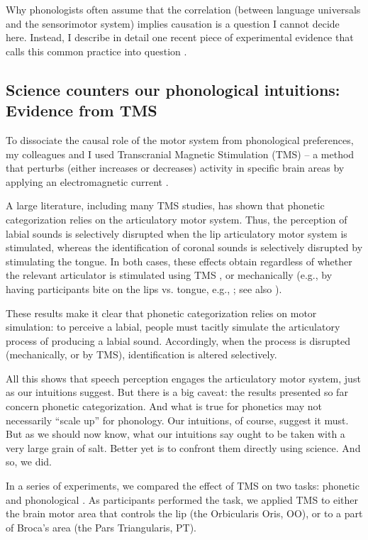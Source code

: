 \documentclass[output=paper,colorlinks,citecolor=brown
]{langscibook}
\begin{document}
Why phonologists often assume that the correlation (between language universals and the sensorimotor system) implies causation is a question I cannot decide here. Instead, I describe in detail one recent piece of experimental evidence that calls this common practice into question \citep{berent2023phonetic}. 

\subsection{Science counters our phonological intuitions: Evidence from TMS}

To dissociate the causal role of the motor system from phonological preferences, my colleagues and I used Transcranial Magnetic Stimulation (TMS) -- a method that perturbs (either increases or decreases) activity in specific brain areas by applying an electromagnetic current \citep{rossi2021safety}.  

A large literature, including many TMS studies, has shown that phonetic categorization relies on the articulatory motor system. Thus, the perception of labial sounds is selectively disrupted when the lip articulatory motor system is stimulated, whereas the identification of coronal sounds is selectively disrupted by stimulating the tongue. In both cases, these effects obtain regardless of whether the relevant articulator is stimulated using TMS \citep{d2012role, d2009motor, mottonen2009motor,smalle2015dissociating}, or mechanically (e.g., by having participants bite on the lips vs. tongue, e.g., \cite{bruderer2015sensorimotor}; see also \cite{berent2020speech}). 

These results make it clear that phonetic categorization relies on motor simulation: to perceive a labial, people must tacitly simulate the articulatory process of producing a labial sound. Accordingly, when the process is disrupted (mechanically, or by TMS), identification is altered selectively.  

All this shows that speech perception engages the articulatory motor system, just as our intuitions suggest. But there is a big caveat: the results presented so far concern phonetic categorization. And what is true for phonetics may not necessarily ``scale up'' for phonology. Our intuitions, of course, suggest it must. But as we should now know, what our intuitions say ought to be taken with a very large grain of salt. Better yet is to confront them directly using science. And so, we did.

In a series of experiments, we compared the effect of TMS on two tasks: phonetic and phonological \citep{berent2023phonetic}. As participants performed the task, we applied TMS to either the brain motor area that controls the lip (the Orbicularis Oris, OO), or to a part of Broca’s area (the Pars Triangularis, PT). 
\end{document}
